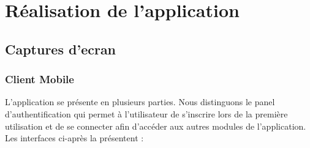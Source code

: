 \chapter{Réalisation de l'application}

\section{Captures d'ecran}
\subsection{Client Mobile}
L'application se présente en plusieurs parties. Nous distinguons le panel d’authentification qui permet
à l’utilisateur de s’inscrire lors de la première utilisation et de se connecter afin d’accéder aux
autres modules de l’application. Les interfaces ci-après la présentent :

